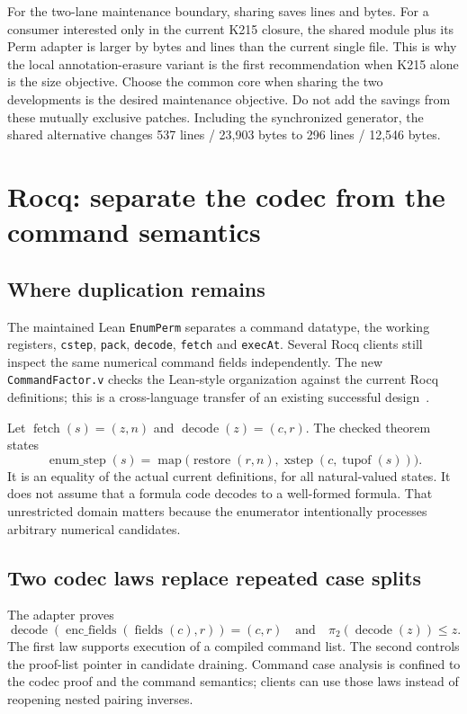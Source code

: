 \documentclass[11pt,letterpaper]{article}
\theoremstyle{definition}\newtheorem{definition}[theorem]{Definition}
\newcommand{\code}[1]{\texttt{#1}}
\begin{document}
For the two-lane maintenance boundary, sharing saves \SharedSavedLines{} lines and
\SharedSavedBytes{} bytes. For a consumer interested only in the current K215
closure, the shared module plus its Perm adapter is larger by \SharedPermExtraBytes{}
bytes and \SharedPermExtraLines{} lines than the current single file. This is why
the local annotation-erasure variant is the first recommendation when K215 alone
is the size objective. Choose the common core when sharing the two developments
is the desired maintenance objective. Do not add the savings from these
mutually exclusive patches. Including the synchronized generator, the shared
alternative changes 537 lines / 23,903 bytes to 296 lines / 12,546 bytes.

\section{Rocq: separate the codec from the command semantics}

\subsection{Where duplication remains}

The maintained Lean \code{EnumPerm} separates a command datatype, the working
registers, \code{cstep}, \code{pack}, \code{decode}, \code{fetch} and
\code{execAt}. Several Rocq clients still inspect the same numerical command
fields independently. The new \code{CommandFactor.v} checks the Lean-style
organization against the current Rocq definitions; this is a cross-language
transfer of an existing successful design~\cite{enumerator}.

Let $\operatorname{fetch}(s)=(z,n)$ and
$\operatorname{decode}(z)=(c,r)$. The checked theorem states
\[
 \operatorname{enum\_step}(s)=
 \operatorname{map}\bigl(\operatorname{restore}(r,n),
                         \operatorname{xstep}(c,\operatorname{tupof}(s))\bigr).
\]
It is an equality of the actual current definitions, for all natural-valued
states. It does not assume that a formula code decodes to a well-formed formula.
That unrestricted domain matters because the enumerator intentionally processes
arbitrary numerical candidates.

\subsection{Two codec laws replace repeated case splits}

The adapter proves
\[
 \operatorname{decode}(\operatorname{enc\_fields}(\operatorname{fields}(c),r))=(c,r)
 \quad\text{and}\quad
 \pi_2(\operatorname{decode}(z))\le z.
\]
The first law supports execution of a compiled command list. The second controls
the proof-list pointer in candidate draining. Command case analysis is confined
to the codec proof and the command semantics; clients can use those laws instead
of reopening nested pairing inverses.
\end{document}

